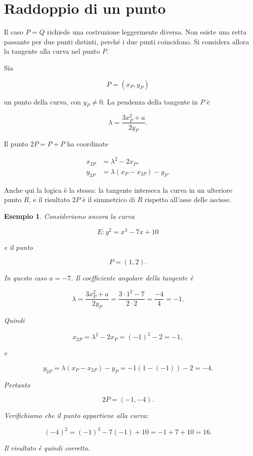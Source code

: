 \documentclass[12pt,a4paper,oneside]{report}
\newtheorem{example}{Esempio}[chapter]
\begin{document}
\section{Raddoppio di un punto}

Il caso \(P=Q\) richiede una costruzione leggermente diversa. Non esiste una retta passante per due punti distinti, perché i due punti coincidono. Si considera allora la tangente alla curva nel punto \(P\).

Sia

\[
P=(x_P,y_P)
\]

un punto della curva, con \(y_P \neq 0\). La pendenza della tangente in \(P\) è

\begin{equation}
    \lambda = \frac{3x_P^2+a}{2y_P}.
    \label{eq:lambda-double-real}
\end{equation}

Il punto \(2P=P+P\) ha coordinate

\begin{align}
    x_{2P} &= \lambda^2 - 2x_P, \label{eq:double-x-real} \\
    y_{2P} &= \lambda(x_P-x_{2P})-y_P. \label{eq:double-y-real}
\end{align}

Anche qui la logica è la stessa: la tangente interseca la curva in un ulteriore punto \(R\), e il risultato \(2P\) è il simmetrico di \(R\) rispetto all'asse delle ascisse.

\begin{example}
Consideriamo ancora la curva

\[
E: y^2 = x^3 - 7x + 10
\]

e il punto

\[
P=(1,2).
\]

In questo caso \(a=-7\). Il coefficiente angolare della tangente è

\[
\lambda = \frac{3x_P^2+a}{2y_P}
= \frac{3\cdot 1^2 -7}{2\cdot 2}
= \frac{-4}{4}
= -1.
\]

Quindi

\[
x_{2P} = \lambda^2 -2x_P = (-1)^2 -2 = -1,
\]

e

\[
y_{2P} = \lambda(x_P-x_{2P})-y_P
= -1(1-(-1))-2
= -4.
\]

Pertanto

\[
2P=(-1,-4).
\]

Verifichiamo che il punto appartiene alla curva:

\[
(-4)^2 = (-1)^3 -7(-1)+10 = -1+7+10 = 16.
\]

Il risultato è quindi corretto.
\end{example}
\end{document}
